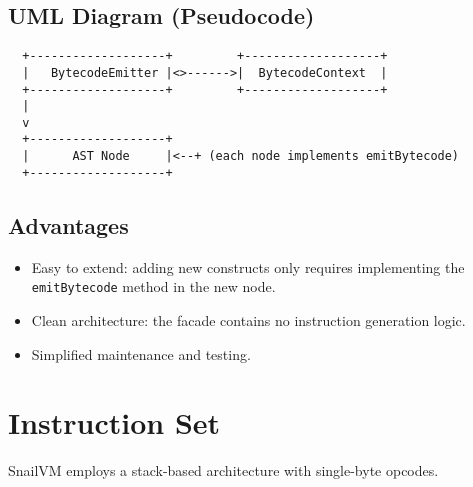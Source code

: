 \documentclass[a4paper,12pt]{article}
\begin{document}
\subsection{UML Diagram (Pseudocode)}
\begin{verbatim}
  +-------------------+         +-------------------+
  |   BytecodeEmitter |<>------>|  BytecodeContext  |
  +-------------------+         +-------------------+
  |
  v
  +-------------------+
  |      AST Node     |<--+ (each node implements emitBytecode)
  +-------------------+
\end{verbatim}

\subsection{Advantages}
\begin{itemize}
\item Easy to extend: adding new constructs only requires implementing the \texttt{emitBytecode} method in the new node.
\item Clean architecture: the facade contains no instruction generation logic.
\item Simplified maintenance and testing.
\end{itemize}

\section{Instruction Set}
  SnailVM employs a stack-based architecture with single-byte opcodes.
\end{document}
